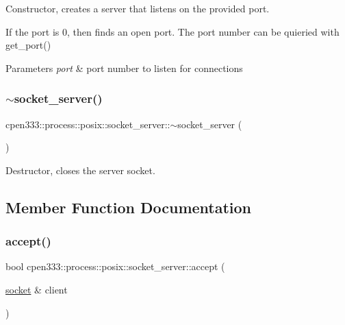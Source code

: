 Constructor, creates a server that listens on the provided port. 

If the port is 0, then finds an open port. The port number can be quieried with get\+\_\+port()


\begin{DoxyParams}{Parameters}
{\em port} & port number to listen for connections \\
\hline
\end{DoxyParams}
\mbox{\label{classcpen333_1_1process_1_1posix_1_1socket__server_a2d07def5c83de193cc2f19c51be31c17}} 
\subsubsection{\texorpdfstring{$\sim$socket\+\_\+server()}{~socket\_server()}}
{\footnotesize\ttfamily cpen333\+::process\+::posix\+::socket\+\_\+server\+::$\sim$socket\+\_\+server (\begin{DoxyParamCaption}{ }\end{DoxyParamCaption})\hspace{0.3cm}{\ttfamily [inline]}}



Destructor, closes the server socket. 



\subsection{Member Function Documentation}
\mbox{\label{classcpen333_1_1process_1_1posix_1_1socket__server_ae68768699a5ddc4550263dd758f4e708}} 
\subsubsection{\texorpdfstring{accept()}{accept()}}
{\footnotesize\ttfamily bool cpen333\+::process\+::posix\+::socket\+\_\+server\+::accept (\begin{DoxyParamCaption}\item[{\hyperlink{classcpen333_1_1process_1_1posix_1_1socket}{socket} \&}]{client }\end{DoxyParamCaption})\hspace{0.3cm}{\ttfamily [inline]}}



